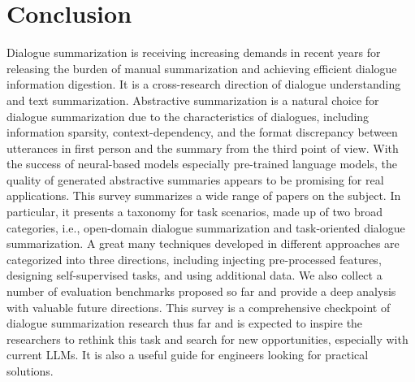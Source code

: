 \section{Conclusion}


Dialogue summarization is receiving increasing demands in recent years for releasing the burden of manual summarization and achieving efficient dialogue information digestion.
It is a cross-research direction of dialogue understanding and text summarization.
Abstractive summarization is a natural choice for dialogue 
summarization due to the characteristics of dialogues, including information 
sparsity, context-dependency, and the format discrepancy between 
utterances in first person and the summary from the third point of view. 
With the success of neural-based models especially pre-trained language models, 
the quality of generated abstractive summaries appears to be promising
for real applications.
This survey summarizes a wide range of papers on the subject.
In particular, it presents a taxonomy for task scenarios, made up of two broad categories, i.e., open-domain dialogue summarization and task-oriented dialogue summarization.
A great many techniques developed in different approaches are categorized into three directions, including injecting pre-processed features, designing self-supervised tasks, and using additional data.
We also collect a number of evaluation benchmarks proposed so far and provide a deep analysis with valuable future directions.
This survey is a comprehensive checkpoint of dialogue summarization research thus far
and is expected to inspire the researchers to rethink this task and 
search for new opportunities, especially with current LLMs. It is also a useful guide for engineers 
looking for practical solutions.
